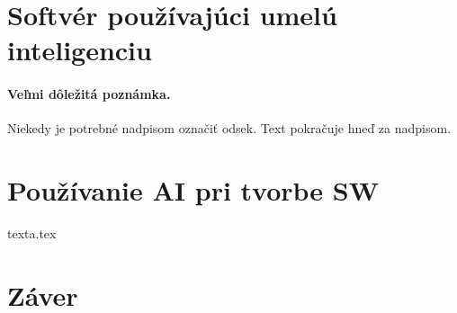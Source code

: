 \documentclass[10pt,twoside,slovak,a4paper]{article}
\begin{document}
\section{Softvér používajúci umelú inteligenciu} \label{AISW}

\paragraph{Veľmi dôležitá poznámka.}
Niekedy je potrebné nadpisom označiť odsek. Text pokračuje hneď za nadpisom.

\section{Používanie AI pri tvorbe SW} \label{pouzitie AI pri SW}

 {texta.tex}

\section{Záver} \label{zaver} %



 
\end{document}
